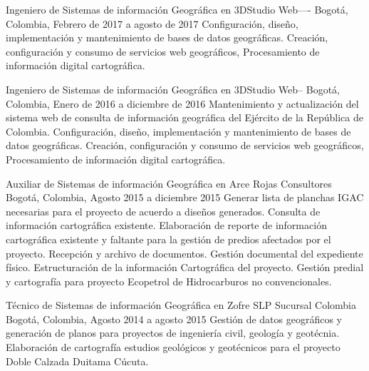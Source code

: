 \documentclass[]{friggeri-cv}
\begin{document}
\begin{entrylist}
  \entry
    
    {Ingeniero de Sistemas de información Geográfica en 3DStudio Web----}
    {Bogotá, Colombia, Febrero de 2017 a agosto de 2017}
    {Configuración, diseño, implementación y mantenimiento de bases de datos geográficas. Creación, configuración y consumo de servicios web geográficos, Procesamiento de información digital cartográfica.\\}
\end{entrylist}

\begin{entrylist}
  \entry
    
    {Ingeniero de Sistemas de información Geográfica en 3DStudio Web--}
    {Bogotá, Colombia, Enero de 2016 a diciembre de 2016}
    {Mantenimiento y actualización del sistema web de consulta de información geográfica del Ejército de la República de Colombia. Configuración, diseño, implementación y mantenimiento de bases de datos geográficas. Creación, configuración y consumo de servicios web geográficos, Procesamiento de información digital cartográfica.\\}
\end{entrylist}

\begin{entrylist}
  \entry
    
    {Auxiliar de Sistemas de información Geográfica en Arce Rojas Consultores}
    {Bogotá, Colombia, Agosto 2015 a diciembre 2015}
    {Generar lista de planchas IGAC necesarias para el proyecto de acuerdo a diseños generados. Consulta de información cartográfica existente. Elaboración de reporte de información cartográfica existente y faltante para la gestión de predios afectados por el proyecto. Recepción y archivo de documentos. Gestión documental del expediente físico. Estructuración de la información Cartográfica del proyecto. Gestión predial y cartografía para proyecto Ecopetrol de Hidrocarburos no convencionales.\\}
\end{entrylist}

\begin{entrylist}
  \entry
    
    {Técnico de Sistemas de información Geográfica en Zofre SLP Sucursal Colombia}
    {Bogotá, Colombia, Agosto 2014 a agosto 2015}
    {Gestión de datos geográficos y generación de planos para proyectos de ingeniería civil, geología y geotécnia. Elaboración de cartografía estudios geológicos y geotécnicos para el proyecto Doble Calzada Duitama Cúcuta.\\}
\end{entrylist}
\end{document}

